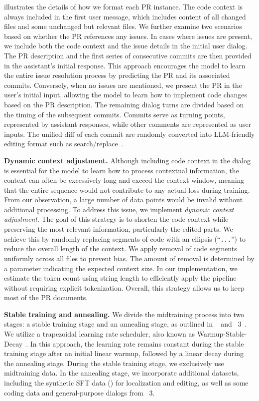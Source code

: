  illustrates the details of how we format each PR instance.
The code context is always included in the first user message, which includes content of all changed files and some unchanged but relevant files.
We further examine two scenarios based on whether the PR references any issues.
In cases where issues are present, we include both the code context and the issue details in the initial user dialog. The PR description and the first series of consecutive commits are then provided in the assistant's initial response.
This approach encourages the model to learn the entire issue resolution process by predicting the PR and its associated commits.
Conversely, when no issues are mentioned, we present the PR in the user's initial input, allowing the model to learn how to implement code changes based on the PR description.
The remaining dialog turns are divided based on the timing of the subsequent commits. Commits serve as turning points, represented by assistant responses, while other comments are represented as user inputs.
The unified diff of each commit are randomly converted into LLM-friendly editing format such as search/replace~\cite{agentless}.

\textbf{Dynamic context adjustment.}
Although including code context in the dialog is essential for the model to learn how to process contextual information, the context can often be excessively long and exceed the context window,
meaning that the entire sequence would not contribute to any actual loss during training.
From our observation, a large number of data points would be invalid without additional processing.
To address this issue, we implement \emph{dynamic context adjustment}.
The goal of this strategy is to shorten the code context while preserving the most relevant information, particularly the edited parts. We achieve this by randomly replacing segments of code with an ellipsis (``\texttt{...}'') to reduce the overall length of the context.
We apply removal of code segments uniformly across all files to prevent bias.
The amount of removal is determined by a parameter indicating the expected context size.
In our implementation, we estimate the token count using string length to efficiently apply the pipeline without requiring explicit tokenization.
Overall, this strategy allows us to keep most of the PR documents.

\textbf{Stable training and annealing.}
We divide the midtraining process into two stages: a stable training stage and an annealing stage, as outlined in \minicpm~\cite{minicpm} and \llama~3~\cite{llama31}.
We utilize a trapezoidal learning rate scheduler, also known as Warmup-Stable-Decay~\cite{minicpm}. In this approach, the learning rate remains constant during the stable training stage after an initial linear warmup, followed by a linear decay during the annealing stage.
During the stable training stage, we exclusively use midtraining data. In the annealing stage, we incorporate additional datasets, including the synthetic SFT data () for localization and editing, as well as some coding data and general-purpose dialogs from \llama~3.

